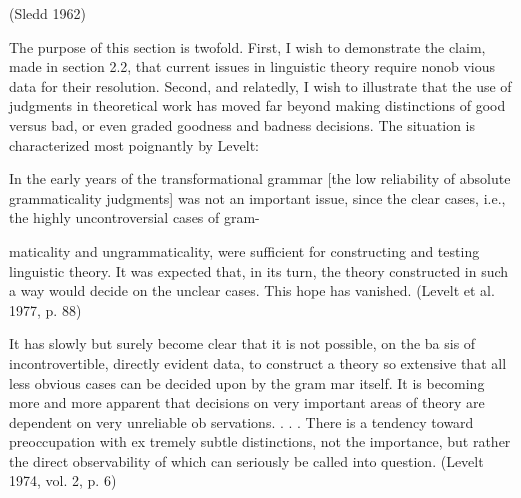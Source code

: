 \begin{styleStandard}
(Sledd 1962)
\end{styleStandard}


\begin{styleTextbody}
The purpose of this section is twofold. First, I wish to demonstrate the claim, made in section 2.2, that current issues in linguistic theory require nonob\- vious data for their resolution. Second, and relatedly, I wish to illustrate that the use of judgments in theoretical work has moved far beyond making distinctions of good versus bad, or even graded goodness and badness decisions. The situation is characterized most poignantly by Levelt:
\end{styleTextbody}


\begin{styleTextbody}
In the early years of the transformational grammar [the low reliability of absolute grammaticality judgments] was not an important issue, since the {\textquotesingle}clear cases,{\textquotesingle} i.e., the highly uncontroversial cases of gram-
\end{styleTextbody}


\clearpage\setcounter{page}{1}\begin{styleStandard}
maticality and ungrammaticality, were sufficient for constructing and testing linguistic theory. It was expected that, in its turn, the theory constructed in such a way would decide on the {\textquotesingle}unclear cases.{\textquotesingle} This hope has vanished. (Levelt et al. 1977, p. 88)
\end{styleStandard}


\begin{styleStandard}
It has slowly but surely become clear that it is not possible, on the ba\- sis of incontrovertible, directly evident data, to construct a theory so extensive that all less obvious cases can be decided upon by the gram\- mar itself. It is becoming more and more apparent that decisions on very important areas of theory are dependent on very unreliable ob\- servations. . . . There is a tendency toward preoccupation with ex\- tremely subtle distinctions, not the importance, but rather the direct observability of which can seriously be called into question. (Levelt 1974, vol. 2, p. 6)
\end{styleStandard}


